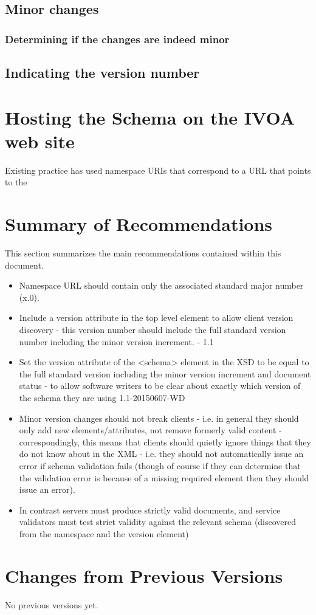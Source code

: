 \documentclass[11pt,a4paper]{ivoa}
\begin{document}
\subsection{Minor changes}
\subsubsection{Determining if the changes are indeed minor}
\subsection{Indicating the version number}
\subse
\section{Hosting the Schema on the IVOA web site}
Existing practice has used namespace URIs that correspond to a URL that points
to the 
\section{Summary of Recommendations}
This section summarizes the main recommendations contained within this document.

\begin{itemize}
\item Namespace URL should contain only the associated standard major number
(x.0).

\item Include a version attribute in the top level element to allow client
version discovery - this version number should include the full standard version
number including the minor version increment. - 1.1

\item Set the version attribute of the <schema> element in the XSD to be equal
to the full standard version including the minor version increment and document status - to
allow software writers to be clear about exactly which version of the schema
they are using 1.1-20150607-WD

\item Minor version changes should not break clients - i.e. in general they
should only add new elements/attributes, not remove formerly valid content -
correspondingly, this means that clients should quietly ignore things that they
do not know about in the XML - i.e. they should not automatically issue an error
if schema validation fails (though of course if they can determine that the
validation error is because of a missing required element then they should
issue an error).
\item In contrast servers must produce strictly valid documents, and service
validators must test strict validity against the relevant schema (discovered
from the namespace and the version element)
\end{itemize}




\appendix


\section{Changes from Previous Versions}

No previous versions yet.  



\end{document}
